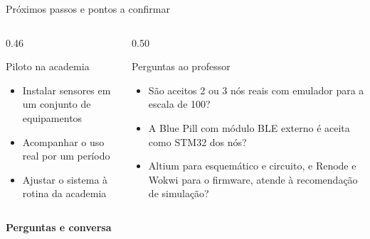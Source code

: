 \documentclass[aspectratio=169,11pt]{beamer}
\begin{document}
\begin{frame}[t]{Próximos passos e pontos a confirmar}
  \begin{columns}[T]
    \begin{column}{0.46\textwidth}
      \begin{block}{Piloto na academia}
        \footnotesize
        \begin{itemize}
          \item Instalar sensores em um conjunto de equipamentos
          \item Acompanhar o uso real por um período
          \item Ajustar o sistema à rotina da academia
        \end{itemize}
      \end{block}
    \end{column}
    \begin{column}{0.50\textwidth}
      \begin{block}{Perguntas ao professor}
        \footnotesize
        \begin{itemize}
          \item São aceitos 2 ou 3 nós reais com emulador para a escala de 100?
          \item A Blue Pill com módulo BLE externo é aceita como STM32 dos nós?
          \item Altium para esquemático e circuito, e Renode e Wokwi para o firmware, atende à recomendação de simulação?
        \end{itemize}
      \end{block}
    \end{column}
  \end{columns}
  \vfill
  \begin{center}
    {\color{navy}\Large\bfseries Perguntas e conversa}
  \end{center}
\end{frame}
\end{document}
